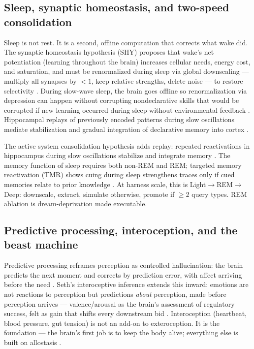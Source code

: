 \documentclass[11pt]{article}
\begin{document}
\subsection{Sleep, synaptic homeostasis, and two-speed consolidation}

Sleep is not rest. It is a second, offline computation that corrects what wake did. The synaptic homeostasis hypothesis (SHY) proposes that wake's net potentiation (learning throughout the brain) increases cellular needs, energy cost, and saturation, and must be renormalized during sleep via global downscaling --- multiply all synapses by $<1$, keep relative strengths, delete noise --- to restore selectivity \citep{tononi2014}. During slow-wave sleep, the brain goes offline so renormalization via depression can happen without corrupting nondeclarative skills that would be corrupted if new learning occurred during sleep without environmental feedback \citep{tononi2014}. Hippocampal replays of previously encoded patterns during slow oscillations mediate stabilization and gradual integration of declarative memory into cortex \citep{tononi2014}.

The active system consolidation hypothesis adds replay: repeated reactivations in hippocampus during slow oscillations stabilize and integrate memory \citep{tononi2014}. The memory function of sleep requires both non-REM and REM; targeted memory reactivation (TMR) shows cuing during sleep strengthens traces only if cued memories relate to prior knowledge \citep{tononi2014}. At harness scale, this is Light$\to$\allowbreak{}REM$\to$\allowbreak{}Deep: downscale, extract, simulate otherwise, promote if $\geq$2 query types. REM ablation is dream-deprivation made executable.

\subsection{Predictive processing, interoception, and the beast machine}

Predictive processing reframes perception as controlled hallucination: the brain predicts the next moment and corrects by prediction error, with affect arriving before the need \citep{seth2021,clark2016surfing}. Seth's interoceptive inference extends this inward: emotions are not reactions to perception but predictions \emph{about} perception, made before perception arrives --- valence/arousal as the brain's assessment of regulatory success, felt as gain that shifts every downstream bid \citep{seth2021}. Interoception (heartbeat, blood pressure, gut tension) is not an add-on to exteroception. It is the foundation --- the brain's first job is to keep the body alive; everything else is built on allostasis \citep{seth2021,clark2016surfing}.
\end{document}

